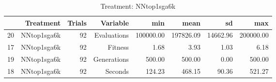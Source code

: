 \begin{table}[ht]
\centering
\begin{tabular}{rrrrrrrr}
  \hline
 & Treatment & Trials & Variable & min & mean & sd & max \\ 
  \hline
20 & NNtop1sga6k &  92 & Evaluations & 100000.00 & 197826.09 & 14662.96 & 200000.00 \\ 
  17 & NNtop1sga6k &  92 & Fitness & 1.68 & 3.93 & 1.03 & 6.18 \\ 
  19 & NNtop1sga6k &  92 & Generations & 500.00 & 500.00 & 0.00 & 500.00 \\ 
  18 & NNtop1sga6k &  92 & Seconds & 124.23 & 468.15 & 90.36 & 521.27 \\ 
   \hline
\end{tabular}
\caption{Treatment: NNtop1sga6k} 
\end{table}

